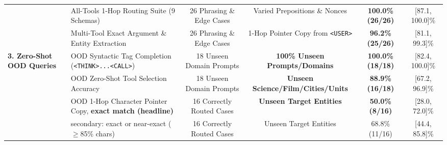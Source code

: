 \documentclass[10pt,twocolumn]{article}
\begin{document}
\begin{table}[t]
{\begin{tabular}{@{}llcccc@{}}
 & All-Tools 1-Hop Routing Suite (9 Schemas) & 26 Phrasing \& Edge Cases & Varied Prepositions \& Nonces & \textbf{100.0\% (26/26)} & [87.1, 100.0]\% \\
 & Multi-Tool Exact Argument \& Entity Extraction & 26 Phrasing \& Edge Cases & 1-Hop Pointer Copy from \texttt{<USER>} & \textbf{96.2\% (25/26)} & [81.1, 99.3]\% \\
\midrule
\multirow{4}{*}{\textbf{3. Zero-Shot OOD Queries}} 
 & OOD Syntactic Tag Completion (\texttt{<THINK>...<CALL>}) & 18 Unseen Domain Prompts & \textbf{100\% Unseen Prompts/Domains} & \textbf{100.0\% (18/18)} & [82.4, 100.0]\% \\
 & OOD Zero-Shot Tool Selection Accuracy & 18 Unseen Domain Prompts & \textbf{Unseen Science/Film/Cities/Units} & \textbf{88.9\% (16/18)} & [67.2, 96.9]\% \\
 & OOD 1-Hop Character Pointer Copy, \textbf{exact match (headline)} & 16 Correctly Routed Cases & \textbf{Unseen Target Entities} & \textbf{50.0\% (8/16)} & [28.0, 72.0]\% \\
 & \quad secondary: exact or near-exact ($\ge$85\% chars) & 16 Correctly Routed Cases & Unseen Target Entities & 68.8\% (11/16) & [44.4, 85.8]\% \\
\bottomrule
\end{tabular}%
}
\end{table}
\end{document}
